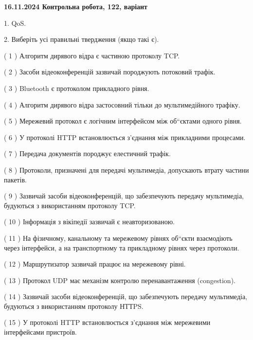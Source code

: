 \documentclass[12pt, ukrainian]{article}
\begin{document}
\vspace{4mm}
\newpage
\begin {large}

\textbf{16.11.2024 Контрольна робота, 122, варіант  }\par


{
1. QoS.



\vspace{5mm}
2. Виберіть усі правильні твердження (якщо такі є).\par
\vspace{2mm}

( 1 ) Алгоритм дирявого відра є частиною протоколу TCP.

( 2 ) Засоби відеоконференцій зазвичай породжують потоковий трафік.

( 3 ) Bluetooth є протоколом прикладного рівня.

( 4 ) Алгоритм дирявого відра застосовний тільки до мультимедійного трафіку.

( 5 ) Мережевий протокол є логічним інтерфейсом між об“єктами одного рівня.

( 6 ) У протоколі HTTP встановлюється з'єднання між прикладними процесами.

( 7 ) Передача документів породжує елестичний трафік.

( 8 ) Протоколи, призначені для передачі мультимедіа, допускають втрату частини пакетів.

( 9 ) Зазвичай засоби відеоконференцій, що забезпечують передачу мультимедіа, будуються з використанням протоколу TCP.

( 10 ) Інформація з вікіпедії зазвичай є неавторизованою.

( 11 ) На фізичному, канальному та мережевому рівнях об“єкти взаємодіють через інтерфейси, а на транспортному та прикладному рівнях через протоколи.

( 12 ) Маршрутизатор зазвичай працює на мережевому рівні.

( 13 ) Протокол UDP має механізм контролю перенавантаження (congestion).

( 14 ) Зазвичай засоби відеоконференцій, що забезпечують передачу мультимедіа, будуються з використанням протоколу НТТPS.

( 15 ) У протоколі HTTP встановлюється з'єднання між мережевими інтерфейсами пристроїв.
}
\end {large}
\end{document}
